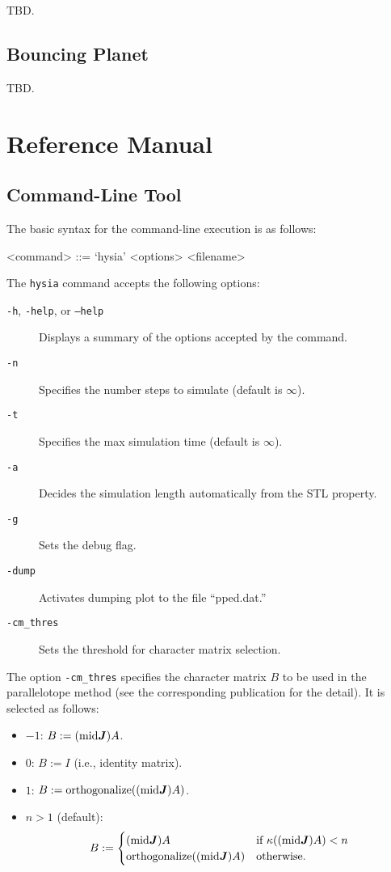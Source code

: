 \documentclass[12pt,a4paper]{article}
\begin{document}
TBD.

\subsection{Bouncing Planet}

TBD.


\section{Reference Manual}

\subsection{Command-Line Tool}

The basic syntax for the command-line execution is as follows:
\begin{grammar}
<command> ::= `hysia' <options> <filename>
\end{grammar}
%
The \texttt{hysia} command accepts the following options:
\begin{description}
\item[\texttt{-h}, \texttt{-help}, or \texttt{--help}] Displays a summary of the options accepted by the command.
\item[\texttt{-n}] Specifies the number steps to simulate (default is $\infty$).
\item[\texttt{-t}] Specifies the max simulation time (default is $\infty$).
\item[\texttt{-a}] Decides the simulation length automatically from the STL property.
\item[\texttt{-g}] Sets the debug flag.
\item[\texttt{-dump}] Activates dumping plot to the file ``pped.dat.''
\item[\texttt{-cm_thres}] Sets the threshold for character matrix selection.
\end{description}

The option \texttt{-cm_thres} specifies the character matrix $B$ to be used in the parallelotope method (see the corresponding publication for the detail). It is selected as follows:
\begin{itemize}
	\item $-1$: $B := (\mathrm{mid}\J) A$.
	\item $0$: $B := I$ (i.e., identity matrix).
	\item $1$: $B := \mathrm{orthogonalize}((\mathrm{mid}\J) A)$.
	\item $n > 1$ (default): 
		\[
			B := \begin{cases}
				(\mathrm{mid}\J) A & \text{if $\kappa((\mathrm{mid}\J) A) < n$} \\
				\mathrm{orthogonalize}((\mathrm{mid}\J) A) & \text{otherwise.}
			\end{cases}
		\]
\end{itemize}
\end{document}
